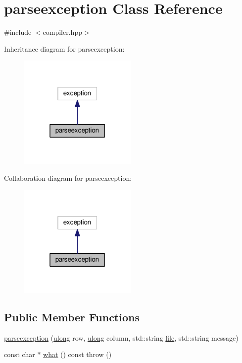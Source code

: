 \hypertarget{classparseexception}{}\section{parseexception Class Reference}
\label{classparseexception}


{\ttfamily \#include $<$compiler.\+hpp$>$}



Inheritance diagram for parseexception\+:\nopagebreak
\begin{figure}[H]
\begin{center}
\leavevmode
\includegraphics[width=163pt]{classparseexception__inherit__graph}
\end{center}
\end{figure}


Collaboration diagram for parseexception\+:\nopagebreak
\begin{figure}[H]
\begin{center}
\leavevmode
\includegraphics[width=163pt]{classparseexception__coll__graph}
\end{center}
\end{figure}
\subsection*{Public Member Functions}
\begin{DoxyCompactItemize}
\item 
\hyperlink{classparseexception_a16accd5bc62f4465b611b38db6751e0e}{parseexception} (\hyperlink{types_8h_ab2bb0e5480d1d957383df6b350794313}{ulong} row, \hyperlink{types_8h_ab2bb0e5480d1d957383df6b350794313}{ulong} column, std\+::string \hyperlink{classparseexception_a99a096bfed3e48cd365cdae1952bc017}{file}, std\+::string message)
\item 
const char $\ast$ \hyperlink{classparseexception_a006c6421028f780b91eb4a473265dce7}{what} () const   throw ()
\end{DoxyCompactItemize}
